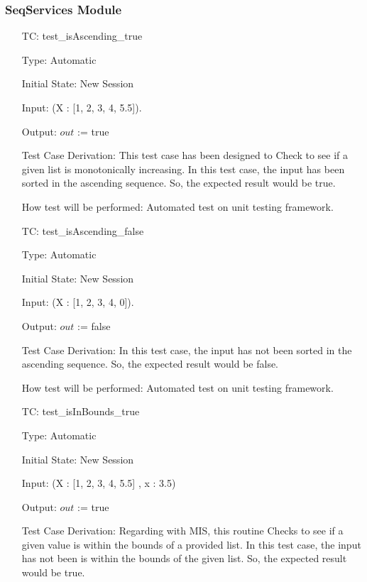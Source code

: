 \documentclass[12pt]{article}
\newcounter{utestnum} %
\begin{document}
\subsubsection{SeqServices Module}

\begin{enumerate}[label=TC\arabic*:,ref={\arabic*}]
	
	\item [TC\refstepcounter{utestnum}\theutestnum: \label{isAscendingTest}] 
	test\_isAscending\_true
	
	Type: Automatic
	
	Initial State: New Session
	
	Input: (X : [1, 2, 3, 4, 5.5]).
	
	Output: $out$ := true
	
	Test Case Derivation: This test case has been designed to Check to see if a given list is monotonically increasing. In this test case, the input has been sorted in the ascending sequence. So, the expected result would be true.
	
	How test will be performed: Automated test on unit testing framework.
	
	\item [TC\refstepcounter{utestnum}\theutestnum: \label{notisAscendingTest}] 
	test\_isAscending\_false
	
	Type: Automatic
	
	Initial State: New Session
	
	Input: (X : [1, 2, 3, 4, 0]).

	
	Output: $out$ := false
	
	Test Case Derivation: In this test case, the input has not been sorted in the ascending sequence. So, the expected result would be false.
	
	How test will be performed: Automated test on unit testing framework.
	
		\item [TC\refstepcounter{utestnum}\theutestnum: \label{isInBoundsTest}] 
	test\_isInBounds\_true
	
	Type: Automatic
	
	Initial State: New Session
	
	Input: (X : [1, 2, 3, 4, 5.5] , x : 3.5)
	
	Output: $out$ := true
	
	Test Case Derivation: Regarding with MIS, this routine Checks to see if a given value is within the bounds of a provided list. In this test case, the input has not been is within the bounds of the given list. So, the expected result would be true.
	

\end{enumerate}
\end{document}
